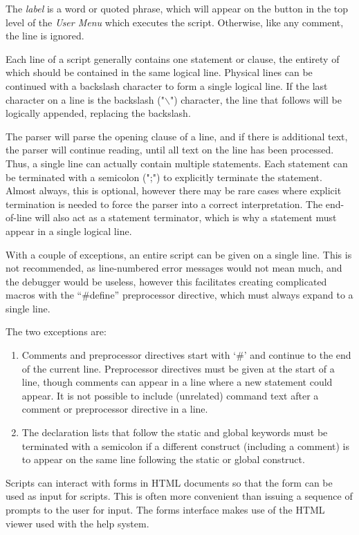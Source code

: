 The {\it label} is a word or quoted phrase, which will appear on the
button in the top level of the {\it User Menu} which executes the
script.  Otherwise, like any comment, the line is ignored.

Each line of a script generally contains one statement or clause, the
entirety of which should be contained in the same logical line. 
Physical lines can be continued with a backslash character to form a
single logical line.  If the last character on a line is the backslash
({\vt "{$\backslash$}"}) character, the line that follows will be
logically appended, replacing the backslash.

The parser will parse the opening clause of a line, and if there is
additional text, the parser will continue reading, until all text on
the line has been processed.  Thus, a single line can actually contain
multiple statements.  Each statement can be terminated with a
semicolon ({\vt ";"}) to explicitly terminate the statement.  Almost
always, this is optional, however there may be rare cases where
explicit termination is needed to force the parser into a correct
interpretation.  The end-of-line will also act as a statement
terminator, which is why a statement must appear in a single logical
line.

With a couple of exceptions, an entire script can be given on a single line. 
This is not recommended, as line-numbered error messages would not
mean much, and the debugger would be useless, however this facilitates
creating complicated macros with the ``{\vt \#define}'' preprocessor
directive, which must always expand to a single line.

The two exceptions are:
\begin{enumerate}
\item{Comments and preprocessor directives start with `\#' and
continue to the end of the current line.  Preprocessor directives must
be given at the start of a line, though comments can appear in a line
where a new statement could appear.  It is not possible to include
(unrelated) command text after a comment or preprocessor directive in
a line.}

\item{The declaration lists that follow the {\vt static} and {\vt
global} keywords must be terminated with a semicolon if a different
construct (including a comment) is to appear on the same line
following the {\vt static} or {\vt global} construct.}
\end{enumerate}

Scripts can interact with forms in HTML documents so that the form can
be used as input for {\Xic} scripts.  This is often more convenient
than issuing a sequence of prompts to the user for input.  The forms
interface makes use of the HTML viewer used with the help system.

